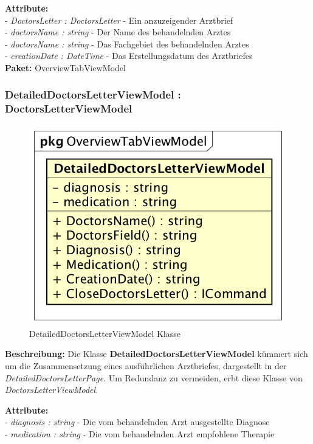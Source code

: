 \documentclass[a4paper]{scrreprt}
\begin{document}
\textbf{Attribute:}\\
- \textit{DoctorsLetter : DoctorsLetter} - Ein anzuzeigender Arztbrief\\
- \textit{doctorsName : string} - Der Name des behandelnden Arztes\\
- \textit{doctorsName : string} - Das Fachgebiet des behandelnden Arztes\\
- \textit{creationDate : DateTime} - Das Erstellungsdatum des Arztbriefes\\

\textbf{Paket:} OverviewTabViewModel

\subsubsection{DetailedDoctorsLetterViewModel : DoctorsLetterViewModel}
\begin{figure}[H]
\centering
\includegraphics[width=0.45\textheight]{graphics/Klassendiagramme/ViewModel/DetailedDoctorsLetterViewModel.png}
\caption{DetailedDoctorsLetterViewModel Klasse}
\end{figure}

\textbf{Beschreibung:} Die Klasse \textbf{DetailedDoctorsLetterViewModel} kümmert sich um die Zusammensetzung eines ausführlichen Arztbriefes, dargestellt in der \textit{DetailedDoctorsLetterPage}. Um Redundanz zu vermeiden, erbt diese Klasse von \textit{DoctorsLetterViewModel}.

\textbf{Attribute:}\\
- \textit{diagnosis : string} - Die vom behandelnden Arzt ausgestellte Diagnose\\
- \textit{medication : string} - Die vom behandelnden Arzt empfohlene Therapie\\
\end{document}
